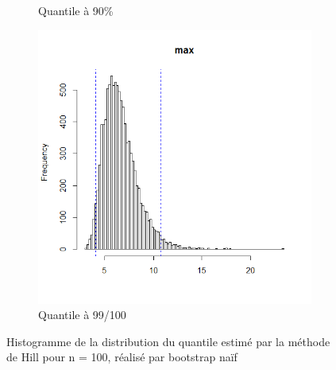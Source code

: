 \documentclass{article}
\renewcommand*{\(}{ \left( }
\renewcommand*{\)}{ \right) }
\begin{document}
\begin{figure}[H]
\begin{subfigure}[t]{0.3\textwidth}
        \caption{Quantile à 90\%}
        \label{fig:BAH90}
    \end{subfigure}%
    \begin{subfigure}[t]{0.3\textwidth}
        \includegraphics[width = \linewidth]{img/BootstrapAHill-Max-100-V2.png}
        \caption{Quantile à 99/100}
        \label{fig:BAHMax}
    \end{subfigure}%
    \caption{Histogramme de la distribution du quantile estimé par la méthode de Hill pour n = 100, réalisé par bootstrap naïf}
    \label{fig:BAH}
\end{figure}
\end{document}
